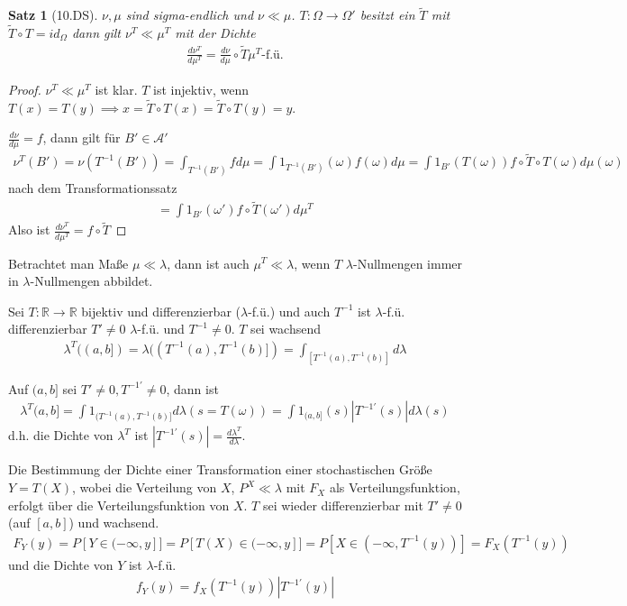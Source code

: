 \documentclass[]{article}
\newtheorem{theorem}{Satz}
\begin{document}
\begin{theorem}[10.DS]
	$\nu,\mu$ sind sigma-endlich und $\nu \ll \mu$. $T:\Omega\rightarrow\Omega'$ besitzt ein $\tilde{T}$ mit $\tilde{T}\circ T = id_{\Omega}$ dann gilt $\nu^T \ll \mu^T$ mit der Dichte
	\begin{align*}
		\frac{d\nu^T}{d\mu^T} = \frac{d\nu}{d\mu} \circ \tilde{T} \mu^T\text{-f.ü.}
	\end{align*}
\end{theorem}

\begin{proof}
	$\nu^T \ll \mu^T$ ist klar. $T$ ist injektiv, wenn $T(x) = T(y) \implies x = \tilde{T}\circ T(x) = \tilde{T}\circ T(y) = y$.
	
	$\frac{d\nu}{d\mu} = f$, dann gilt für $B' \in \mathcal{A}'$
	\begin{align*}
		\nu^T(B') = \nu(T^{-1}(B')) = \int_{T^{-1}(B')} f d\mu = \int 1_{T^{-1}(B')}(\omega) f(\omega) d\mu = \int 1_{B'}(T(\omega)) f \circ \tilde{T} \circ T(\omega) d\mu(\omega)
	\end{align*}
	nach dem Transformationssatz
	\begin{align*}
		= \int 1_{B'} (\omega') f\circ \tilde{T}(\omega') d\mu^T
	\end{align*}
	Also ist $\frac{d\nu^T}{d\mu^T} = f \circ \tilde{T}$
\end{proof}

Betrachtet man Maße $\mu \ll \lambda$, dann ist auch $\mu^T \ll \lambda$, wenn $T$ $\lambda$-Nullmengen immer in $\lambda$-Nullmengen abbildet.

Sei $T:\mathbb{R}\rightarrow\mathbb{R}$ bijektiv und differenzierbar ($\lambda$-f.ü.) und auch $T^{-1}$ ist $\lambda$-f.ü. differenzierbar $T' \neq 0$ $\lambda$-f.ü. und $T^{-1} \neq 0$. $T$ sei wachsend
\begin{align*}
	\lambda^T((a,b]) = \lambda((T^{-1}(a), T^{-1}(b)]) = \int_{[T^{-1}(a),T^{-1}(b)]} d\lambda
\end{align*}

Auf $(a,b]$ sei $T'\neq 0, T^{-1'} \neq 0$, dann ist
\begin{align*}
	\lambda^T(a,b] = \int 1_{(T^{-1}(a),T^{-1}(b)]} d\lambda (s=T(\omega)) = \int 1_{(a,b]}(s) |T^{-1'}(s)| d\lambda(s)
\end{align*}
d.h. die Dichte von $\lambda^T$ ist $|T^{-1'}(s)|=\frac{d\lambda^T}{d\lambda}$.

Die Bestimmung der Dichte einer Transformation einer stochastischen Größe $Y=T(X)$, wobei die Verteilung von $X$, $P^X \ll \lambda$ mit $F_X$ als Verteilungsfunktion, erfolgt über die Verteilungsfunktion von $X$. $T$ sei wieder differenzierbar mit $T'\neq 0$ (auf $[a,b]$) und wachsend.
\begin{align*}
	F_Y(y) = P[Y \in (-\infty, y]] = P[T(X) \in (-\infty, y]] = P[X \in (-\infty, T^{-1}(y))] = F_X(T^{-1}(y))
\end{align*}
und die Dichte von $Y$ ist $\lambda$-f.ü.
\begin{align*}
	f_Y(y) = f_X(T^{-1}(y)) |T^{-1'}(y)|
\end{align*}
\end{document}
